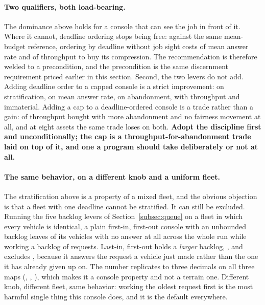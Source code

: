 \documentclass[11pt]{article}
\begin{document}
\paragraph{Two qualifiers, both load-bearing.} The dominance above holds for a console that can see
the job in front of it. Where it cannot, deadline ordering stops being free: against the same
mean-budget reference, ordering by deadline without job sight costs \FqEdfBRate{} of mean answer
rate and \FqEdfBSrv{} of throughput to buy its compression. The recommendation is therefore welded
to a precondition, and the precondition is the same discernment requirement priced earlier in this
section. Second, the two levers do not add. Adding deadline order to a capped console is a strict
improvement: \FcAddEdfRatioFull{} on stratification, \FcAddEdfRateFull{} on mean answer rate,
\FcAddEdfAbandFull{} on abandonment, with throughput \FcAddEdfSrvFull{} and immaterial. Adding a cap
to a deadline-ordered console is a trade rather than a gain: \FcAddCapSrvFull{} of throughput bought
with \FcAddCapAbandFull{} more abandonment and no fairness movement at all, and at eight assets the
same trade loses on both. \textbf{Adopt the discipline first and unconditionally; the cap is a
throughput-for-abandonment trade laid on top of it, and one a program should take deliberately or
not at all.}

\paragraph{The same behavior, on a different knob and a uniform fleet.} The stratification above is a
property of a mixed fleet, and the obvious objection is that a fleet with one deadline cannot be
stratified. It can still be excluded. Running the five backlog levers of Section~\ref{subsec:queue}
on a fleet in which every vehicle is identical, a plain first-in, first-out console with an unbounded
backlog leaves \FmBandFifo{} of its vehicles with no answer at all across the whole run while working
a backlog of \FmFifoBack{} requests. Last-in, first-out holds a \emph{larger} backlog, \FmLifoBack{},
and excludes \FmLifoStarv{}, because it answers the request a vehicle just made rather than the one
it has already given up on. The number replicates to three decimals on all three maps
(\FmBandFifo{}, \FmChokeFifo{}, \FmOpenFifo{}), which makes it a console property and not a terrain
one. Different knob, different fleet, same behavior: working the oldest request first is the most
harmful single thing this console does, and it is the default everywhere.
\end{document}
